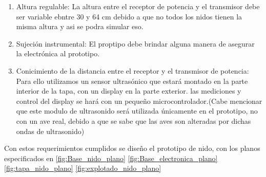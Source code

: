 \begin{enumerate}
También se calcula la impedancia de la madera como:
\begin{equation}
	\eta_{Madera}=\sqrt{\frac{\mu_{Madera}}{\varepsilon_{Madera}}}
\end{equation}

Es así que el coeficiente de reflexión se calcula de la siguiente forma:
\begin{equation}
	\Gamma = \frac{\eta_2 - \eta_1  }{\eta_2 + \eta_1} = -0.1714
	\label{eq:reflexion_madera}
\end{equation}

Se observa en la Ecuación (\ref{eq:reflexion_madera}) que el resultado presenta un valor negativo. Lo que esto implica es una inversión de fase en la onda electromagnética reflejada respecto de la incidente. Esto implica una interferencia destructiva, para determinar las implicancias de esta interferencai se calcula la potencia de la onda reflejada, siendo esta $P_{ref} = |\Gamma|^2 = 0.029$. Es así que se nota que menos de un $3\%$ de la potencia sera reflejada. De esta forma se puede afirmar que no habrá una interferencia significativa con la transmisión original.
Finalmente cabe notar que el resultado del coeficiente de reflexi\'pm no depende del espesor. \'Unicamente de la impedancia de los medios. Por lo que de aqu\'i se concluye que el espesor de la madera no juega un papel significativo en el prototipo de nido.
\item Altura regulable:
La altura entre el receptor de potencia y el transmisor debe ser variable ebntre 30 y 64 cm debido a que no todos los nidos tienen la misma altura y asi se podra simular eso.
\item Sujeci\'on instrumental:
El proptipo debe brindar alguna manera de asegurar la electr\'onica al prototipo.
\item Conicimiento de la distancia entre el receptor y el transmisor de potencia:
Para ello utilizamos un sensor ultrasónico que estará montado en la parte interior de la tapa, con un display en la parte exterior. las mediciones y control del display se hará con un pequeño microcontrolador.(Cabe mencionar que este modulo de ultrasonido ser\'a utilizada \'unicamente en el prototipo, no con un ave real, debido a que se sabe que las aves son alteradas por dichas ondas de ultrasonido)
\end{enumerate} 
Con estos requerimientos cumplidos se diseño el prototipo de nido, con los planos especificados en \ref{fig:Base_nido_plano} \ref{fig:Base_electronica_plano} \ref{fig:tapa_nido_plano} \ref{fig:explotado_nido_plano}



